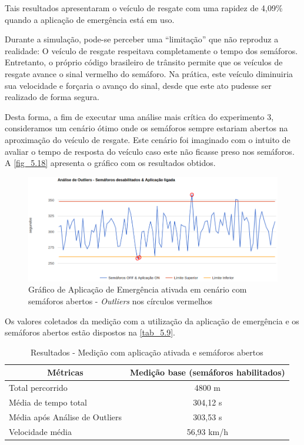 \documentclass[
12pt,				%
openright,			%
oneside,			%
a4paper,			%
brazil,				%
]{abntex2}
\begin{document}
	\par Tais resultados apresentaram o veículo de resgate com uma rapidez de 4,09\% quando a aplicação de emergência está em uso.
	
	\par Durante a simulação, pode-se perceber uma “limitação” que não reproduz a realidade: O veículo de resgate respeitava completamente o tempo dos semáforos. Entretanto, o próprio código brasileiro de trânsito permite que os veículos de resgate avance o sinal vermelho do semáforo. Na prática, este veículo diminuiria sua velocidade e forçaria o avanço do sinal, desde que este ato pudesse ser realizado de forma segura.
	
	\par Desta forma, a fim de executar uma análise mais crítica do experimento 3, consideramos um cenário ótimo onde os semáforos sempre estariam abertos na aproximação do veículo de resgate. Este cenário foi imaginado com o intuito de avaliar o tempo de resposta do veículo caso este não ficasse preso nos semáforos. A \autoref{fig_5.18} apresenta o gráfico com os resultados obtidos.
	
	\begin{figure}[H]
		\centering
		\includegraphics[scale=.4]{figuras/cap5/518Grafico3}
		\caption{\label{fig_5.18}Gráfico de Aplicação de Emergência ativada em cenário com semáforos abertos - \textit{Outliers} nos círculos vermelhos}
	\end{figure}
	
	Os valores coletados da medição com a utilização da aplicação de emergência e os semáforos abertos estão dispostos na \autoref{tab_5.9}.
	
	\begin{table}[H]
		\centering
		\renewcommand{\arraystretch}{1.5}
		\begin{tabular}{|l|c|}
			\hline
			\multicolumn{1}{|c|}{\textbf{Métricas}} & \textbf{Medição base (semáforos habilitados)} \\ \hline
			Total percorrido & 4800 m \\ \hline
			Média de tempo total & 304,12 s \\ \hline
			Média após Análise de Outliers & 303,53 s \\ \hline
			Velocidade média & 56,93 km/h \\ \hline
		\end{tabular}
		\caption{Resultados - Medição com aplicação ativada e semáforos abertos}
		\label{tab_5.9}
	\end{table}
	
\end{document}
